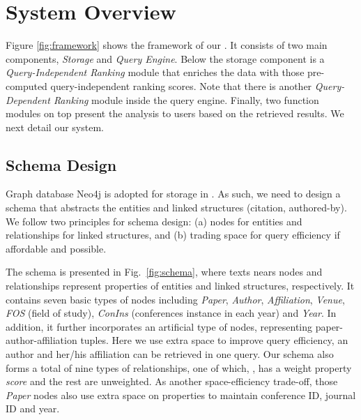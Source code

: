 \section{System Overview}
\label{sec-system}



Figure \ref{fig:framework} shows the framework of our \oursystem. It consists of two main components, \ie \emph{Storage} and \emph{Query Engine}.
Below the storage component is a {\em Query-Independent Ranking} module that enriches the data with those pre-computed query-independent ranking scores. Note that there is another {\em Query-Dependent Ranking} module inside the query engine. Finally, two function modules on top present the analysis  to users based on the retrieved results. We next detail our system.

\subsection{Schema Design} \label{subsec:schema}

Graph database Neo4j is adopted for storage in \oursystem. As such, we need to design a schema that abstracts the entities and linked structures (\eg citation, authored-by).
We follow two principles for schema design: (a) nodes for entities and relationships for linked structures, and (b) trading space for query efficiency if affordable and possible.


The schema is presented in Fig.~\ref{fig:schema}, where texts nears nodes and relationships represent properties of entities and linked structures, respectively.
It contains seven basic types of nodes including {\em Paper}, {\em Author}, {\em Affiliation}, {\em Venue}, {\em FOS} (field of study), {\em ConIns} (conferences instance in each year) and {\em Year}.
In addition, it further incorporates an artificial type of nodes,  representing paper-author-affiliation tuples. Here we use extra space to improve query efficiency, \ie an author and her/his affiliation can be retrieved in one query.
%
Our schema also forms a total of nine types of relationships, one of which, , has a weight property {\em score} and the rest are unweighted.
As another space-efficiency trade-off, those {\em Paper} nodes also use extra space on properties to maintain conference ID, journal ID and year.



